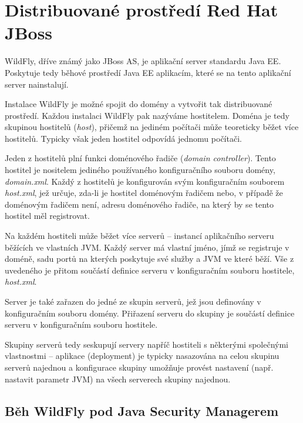 \chapter{Distribuované prostředí Red Hat JBoss}

WildFly, dříve známý jako JBoss AS, je aplikační server standardu Java EE. Poskytuje tedy běhové prostředí Java EE aplikacím, které se na tento aplikační server nainstalují.

Instalace WildFly je možné spojit do domény a vytvořit tak distribuované prostředí. Každou instalaci WildFly pak nazýváme hostitelem. Doména je tedy skupinou hostitelů ({\it host}), přičemž na jediném počítači může teoreticky běžet více hostitelů. Typicky však jeden hostitel odpovídá jednomu počítači.

Jeden z hostitelů plní funkci doménového řadiče ({\it domain controller}). Tento hostitel je nositelem jediného používaného konfiguračního souboru domény, {\it domain.xml}. Každý z hostitelů je konfigurován svým konfiguračním souborem {\it host.xml}, jež určuje, zda-li je hostitel doménovým řadičem nebo, v případě že doménovým řadičem není, adresu doménového řadiče, na který by se tento hostitel měl registrovat. \cite{jbossDomainSetup}

Na každém hostiteli může běžet více serverů -- instancí aplikačního serveru běžících ve vlastních JVM. Každý server má vlastní jméno, jímž se registruje v doméně, sadu portů na kterých poskytuje své služby a JVM ve které běží. Vše z uvedeného je přitom součástí definice serveru v konfiguračním souboru hostitele, {\it host.xml}. \cite{jbossDomainSetup}

Server je také zařazen do jedné ze skupin serverů, jež jsou definovány v konfiguračním souboru domény. Přiřazení serveru do skupiny je součástí definice serveru v konfiguračním souboru hostitele. \cite{jbossDomainSetup}

Skupiny serverů tedy seskupují servery napříč hostiteli s některými společnými vlastnostmi -- aplikace (deployment) je typicky nasazována na celou skupinu serverů najednou a konfigurace skupiny umožňuje provést nastavení (např. nastavit parametr JVM) na všech serverech skupiny najednou. \cite{jbossDomainSetup}

\section{Běh WildFly pod Java Security Managerem}

